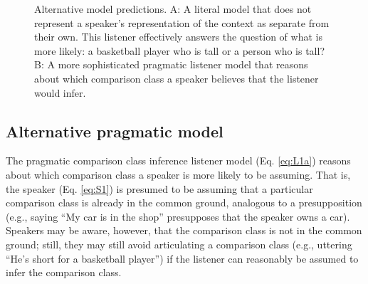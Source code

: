 \documentclass[doc]{apa6}
\begin{document}
\begin{figure}[t]
    \centering
    \caption{Alternative model predictions. A: A literal model that does not represent a speaker's representation of the context as separate from their own. This listener effectively answers the question of what is more likely: a basketball player who is tall or a person who is tall? B: A more sophisticated pragmatic listener model that reasons about which comparison class a speaker believes that the listener would infer.}
    \label{fig:altModels}
\end{figure}


\subsection{Alternative pragmatic model}

The pragmatic comparison class inference listener model (Eq. \ref{eq:L1a}) reasons about which comparison class a speaker is more likely to be assuming.
That is, the speaker (Eq. \ref{eq:S1}) is presumed to be assuming that a particular comparison class is already in the common ground, analogous to a presupposition (e.g., saying ``My car is in the shop'' presupposes that the speaker owns a car). 
Speakers may be aware, however, that the comparison class is not in the common ground; still, they may still avoid articulating a comparison class  (e.g., uttering ``He's short for a basketball player'') if the listener can reasonably be assumed to infer the comparison class. 
\end{document}
